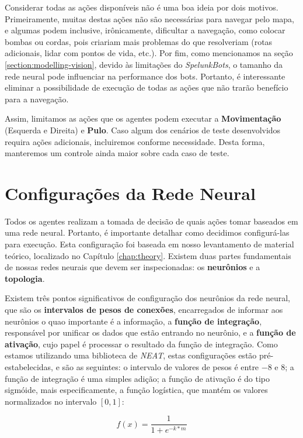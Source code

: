 Considerar todas as ações disponíveis não é uma boa ideia por dois motivos.
Primeiramente, muitas destas ações não são necessárias para navegar pelo mapa, e
algumas podem inclusive, irônicamente, dificultar a navegação, como colocar
bombas ou cordas, pois criariam mais problemas do que resolveriam (rotas
adicionais, lidar com pontos de vida, etc.). Por fim, como mencionamos na seção
\ref{section:modelling-vision}, devido às limitações do \textit{SpelunkBots}, o
tamanho da rede neural pode influenciar na performance dos bots. Portanto, é
interessante eliminar a possibilidade de execução de todas as ações que não
trarão benefício para a navegação.

Assim, limitamos as ações que os agentes podem executar a \textbf{Movimentação}
(Esquerda e Direita) e \textbf{Pulo}. Caso algum dos cenários de teste
desenvolvidos requira ações adicionais, incluiremos conforme necessidade. Desta
forma, manteremos um controle ainda maior sobre cada caso de teste.


\section{\label{section:modelling-network}Configurações da Rede Neural}
Todos os agentes realizam a tomada de decisão de quais ações tomar baseados em
uma rede neural. Portanto, é importante detalhar como decidimos configurá-las
para execução. Esta configuração foi baseada em nosso levantamento de material
teórico, localizado no Capítulo \ref{chap:theory}. Existem duas partes
fundamentais de nossas redes neurais que devem ser inspecionadas: os
\textbf{neurônios} e a \textbf{topologia}.

Existem três pontos significativos de configuração dos neurônios da rede neural,
que são os \textbf{intervalos de pesos de conexões}, encarregados de informar
aos neurônios o quao importante é a informação, a \textbf{função de integração},
responsável por unificar os dados que estão entrando no neurônio, e a
\textbf{função de ativação}, cujo papel é processar o resultado da função de
integração. Como estamos utilizando uma biblioteca de \textit{NEAT}, estas
configurações estão pré-estabelecidas, e são as seguintes: o intervalo de
valores de pesos é entre $-8$ e $8$; a função de integração é uma simples
adição; a função de ativação é do tipo sigmóide, mais especificamente, a função
logística, que mantém os valores normalizados no intervalo $[0,1]$:

\begin{equation}
	\label{eq:neat-activation}
	f(x) = \frac{1}{1+e^{-k*m}}
\end{equation}

